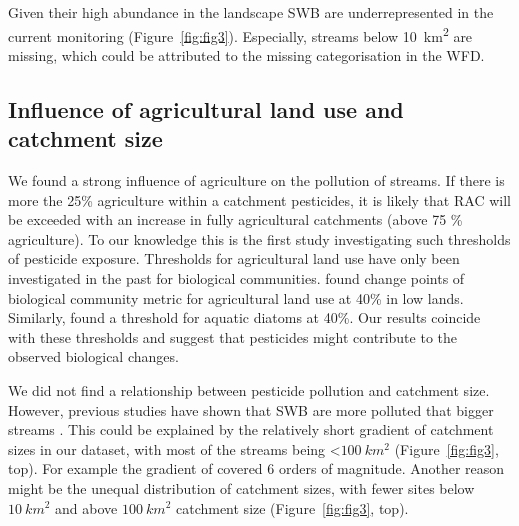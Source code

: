 \documentclass[journal=esthag,manuscript=article]{achemso}
\begin{document}
Given their high abundance in the landscape \citep{nadeau_hydrological_2007} SWB are underrepresented in the current monitoring (Figure~\ref{fig:fig3}). 
Especially, streams below 10~km\textsuperscript{2} are missing, which could be attributed to the missing categorisation in the WFD. 



\subsection{Influence of agricultural land use and catchment size}
We found a strong influence of agriculture on the pollution of streams.
If there is more the 25\% agriculture within a catchment pesticides, it is likely that RAC will be exceeded with an increase in fully agricultural catchments (above 75 \% agriculture).
To our knowledge this is the first study investigating such thresholds of pesticide exposure.
Thresholds for agricultural land use have only been investigated in the past for biological communities.
\citet{feld_response_2013} found change points of biological community metric for agricultural land use at 40\% in low lands. 
Similarly, \citet{waite_agricultural_2014} found a threshold for aquatic diatoms at 40\%.
Our results coincide with these thresholds and suggest that pesticides might contribute to the observed biological changes. 

We did not find a relationship between pesticide pollution and catchment size.
However, previous studies have shown that SWB are more polluted that bigger streams \citep{schulz_field_2004,stehle_pesticide_2015,knauer_pesticides_2016}.
This could be explained by the relatively short gradient of catchment sizes in our dataset, with most of the streams being \textless $100~km^2$ (Figure~\ref{fig:fig3}, top).
For example the gradient of \citet{schulz_field_2004} covered 6 orders of magnitude.
Another reason might be the unequal distribution of catchment sizes, with fewer sites below $10~km^2$ and above $100~km^2$ catchment size (Figure~\ref{fig:fig3}, top).
\end{document}
